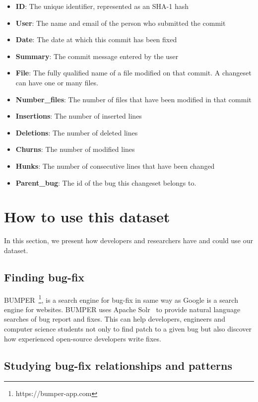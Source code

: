\documentclass{sig-alternate-05-2015}
\begin{document}
\begin{itemize}

  \item 	\textbf{ID}: The unique identifier, represented as an SHA-1
  hash
  \item 	\textbf{User}: The name and email of the person who
  submitted the commit
  \item 	\textbf{Date}: The date at which this commit has been fixed
  \item 	\textbf{Summary}: The commit message entered by the user
  \item 	\textbf{File}: The fully qualified name of a file modified on
  that commit. A changeset can have one or many files.
  \item 	\textbf{Number\_files}: The number of files that have been
  modified in that commit
  \item 	\textbf{Insertions}: The number of inserted lines
  \item 	\textbf{Deletions}: The number of deleted lines
  \item 	\textbf{Churns}: The number of modified lines
  \item 	\textbf{Hunks}: The number of consecutive lines that have
  been changed
  \item 	\textbf{Parent\_bug}: The id of the bug this changeset belongs
  to.
\end{itemize}


\section{How to use this dataset}

In this section, we present how developers and researchers have and could use our dataset.

\subsection{Finding bug-fix}
\label{subs:Bug Fixing}

BUMPER~\cite{Nayrolles2015d,Nayrolles2016}\footnote{https://bumper-app.com}, is a search engine for bug-fix in same way as Google is a search engine for websites. BUMPER uses Apache Solr~\cite{Nayrolles2014b} to provide natural language searches of bug report and fixes.
This can help developers, engineers and computer science students not only to find patch to a given bug but also discover how experienced open-source developers write fixes.

\subsection{Studying bug-fix relationships and patterns}
\label{subs:Studying bug-fix relationships}
\end{document}
